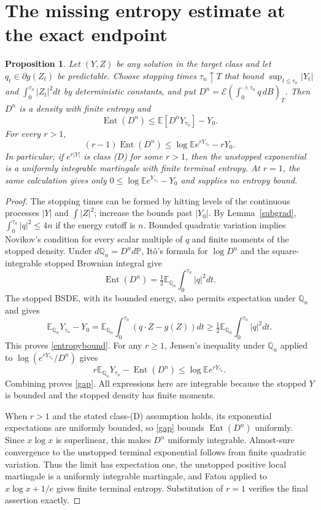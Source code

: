 \documentclass[11pt]{article}
\newtheorem{proposition}[theorem]{Proposition}
\newcommand{\E}{\mathbb E}
\newcommand{\Prb}{\mathbb P}
\newcommand{\Q}{\mathbb Q}
\DeclareMathOperator{\Ent}{Ent}
\begin{document}
\section{The missing entropy estimate at the exact endpoint}
\begin{proposition}\label{entropy}
Let $(Y,Z)$ be any solution in the target class and let
$q_t\in\partial g(Z_t)$ be predictable. Choose stopping times
$\tau_n\uparrow T$ that bound $\sup_{t\leq\tau_n}|Y_t|$ and
$\int_0^{\tau_n}|Z_t|^2dt$ by deterministic constants, and put
$D^n=\mathcal E(\int_0^{\cdot\wedge\tau_n}q\,dB)_T$.
Then $D^n$ is a density with finite entropy and
\begin{equation}\label{entropybound}
 \Ent(D^n)\leq\E[D^nY_{\tau_n}]-Y_0.
\end{equation}
For every $r>1$,
\begin{equation}\label{gap}
 (r-1)\Ent(D^n)
 \leq \log\E e^{rY_{\tau_n}}-rY_0.
\end{equation}
In particular, if $e^{r|Y|}$ is class (D) for some $r>1$, then the
unstopped exponential is a uniformly integrable martingale with finite
terminal entropy. At $r=1$, the same calculation gives only
$0\leq\log\E e^{Y_{\tau_n}}-Y_0$ and supplies no entropy bound.
\end{proposition}
\begin{proof}
The stopping times can be formed by hitting levels of the continuous
processes $|Y|$ and $\int|Z|^2$; increase the bounds past $|Y_0|$.
By Lemma~\ref{subgrad}, $\int_0^{\tau_n}|q|^2\leq4n$ if the energy
cutoff is $n$. Bounded quadratic variation implies Novikov's condition
for every scalar multiple of $q$ and finite moments of the stopped
density. Under $d\Q_n=D^n d\Prb$, It\^o's formula for $\log D^n$
and the square-integrable stopped Brownian integral give
\[
 \Ent(D^n)=\tfrac12\E_{\Q_n}\int_0^{\tau_n}|q|^2dt.
\]
The stopped BSDE, with its bounded energy, also permits expectation under
$\Q_n$ and gives
\[
 \E_{\Q_n}Y_{\tau_n}-Y_0
 =\E_{\Q_n}\int_0^{\tau_n}(q\cdot Z-g(Z))dt
 \geq\tfrac12\E_{\Q_n}\int_0^{\tau_n}|q|^2dt.
\]
This proves \eqref{entropybound}. For any $r\geq1$, Jensen's inequality
under $\Q_n$ applied to $\log(e^{rY_{\tau_n}}/D^n)$ gives
\[
 r\E_{\Q_n}Y_{\tau_n}-\Ent(D^n)
 \leq\log\E e^{rY_{\tau_n}}.
\]
Combining proves \eqref{gap}. All expressions here are integrable because
the stopped $Y$ is bounded and the stopped density has finite moments.

When $r>1$ and the stated class-(D) assumption holds, its exponential
expectations are uniformly bounded, so \eqref{gap} bounds
$\Ent(D^n)$ uniformly. Since $x\log x$ is superlinear, this makes
$D^n$ uniformly integrable. Almost-sure convergence to the unstopped
terminal exponential follows from finite quadratic variation. Thus the
limit has expectation one, the unstopped positive local martingale is a
uniformly integrable martingale, and Fatou applied to $x\log x+1/e$
gives finite terminal entropy. Substitution of $r=1$ verifies the final
assertion exactly.
\end{proof}
\end{document}
